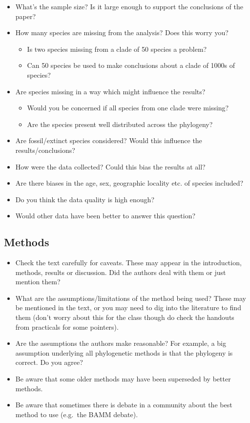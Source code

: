 \documentclass[]{book}
\providecommand{\tightlist}{%
  \setlength{\itemsep}{0pt}\setlength{\parskip}{0pt}}
\begin{document}
\begin{itemize}
\item
  What's the sample size? Is it large enough to support the conclusions
  of the paper?
\item
  How many species are missing from the analysis? Does this worry you?

  \begin{itemize}
  \tightlist
  \item
    Is two species missing from a clade of 50 species a problem?
  \item
    Can 50 species be used to make conclusions about a clade of 1000s of
    species?
  \end{itemize}
\item
  Are species missing in a way which might influence the results?

  \begin{itemize}
  \tightlist
  \item
    Would you be concerned if all species from one clade were missing?
  \item
    Are the species present well distributed across the phylogeny?
  \end{itemize}
\item
  Are fossil/extinct species considered? Would this influence the
  results/conclusions?
\item
  How were the data collected? Could this bias the results at all?
\item
  Are there biases in the age, sex, geographic locality etc. of species
  included?
\item
  Do you think the data quality is high enough?
\item
  Would other data have been better to answer this question?
\end{itemize}

\subsection{Methods}\label{methods}

\begin{itemize}
\item
  Check the text carefully for caveats. These may appear in the
  introduction, methods, results or discussion. Did the authors deal
  with them or just mention them?
\item
  What are the assumptions/limitations of the method being used? These
  may be mentioned in the text, or you may need to dig into the
  literature to find them (don't worry about this for the class though
  do check the handouts from practicals for some pointers).
\item
  Are the assumptions the authors make reasonable? For example, a big
  assumption underlying all phylogenetic methods is that the phylogeny
  is correct. Do you agree?
\item
  Be aware that some older methods may have been superseded by better
  methods.
\item
  Be aware that sometimes there is debate in a community about the best
  method to use (e.g.~the BAMM debate).
\end{itemize}
\end{document}
